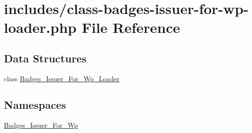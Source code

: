 \hypertarget{class-badges-issuer-for-wp-loader_8php}{}\section{includes/class-\/badges-\/issuer-\/for-\/wp-\/loader.php File Reference}
\label{class-badges-issuer-for-wp-loader_8php}
\subsection*{Data Structures}
\begin{DoxyCompactItemize}
\item 
class \hyperlink{class_badges___issuer___for___wp___loader}{Badges\+\_\+\+Issuer\+\_\+\+For\+\_\+\+Wp\+\_\+\+Loader}
\end{DoxyCompactItemize}
\subsection*{Namespaces}
\begin{DoxyCompactItemize}
\item 
 \hyperlink{namespace_badges___issuer___for___wp}{Badges\+\_\+\+Issuer\+\_\+\+For\+\_\+\+Wp}
\end{DoxyCompactItemize}
